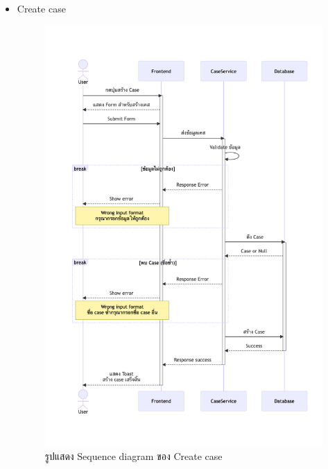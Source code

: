 \documentclass[12pt,oneside,openright,a4paper]{cpe-thai-project}
\begin{document}
\begin{itemize}

    \item Create case\\
    \begin{figure}[!ht]\centering
        \includegraphics[width=13cm, trim={0 4cm 0 0},clip]{./assets/sequence-diagram/create-case.png}
        \caption{รูปแสดง Sequence diagram ของ Create case}\label{fig:sqCreateCase}
    \end{figure}


\end{itemize}
\end{document}
